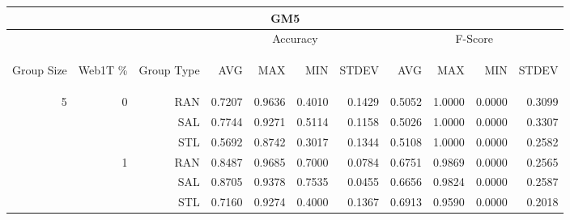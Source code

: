\begin{center}
\begin{table}[htbp]
\begin{tabular}{ | r | r | r | r | r | r | r | r | r | r | r |}
\hline
\multicolumn{11}{|c|}{GM5}\\
\hline
 & & & \multicolumn{4}{|c|}{Accuracy} & \multicolumn{4}{|c|}{F-Score}\\ \cline{4-11}
\begin{sideways}Group Size\end{sideways} & \begin{sideways}Web1T \%\end{sideways} & \begin{sideways}Group Type\end{sideways} & \begin{sideways}AVG\end{sideways} & \begin{sideways}MAX\end{sideways} & \begin{sideways}MIN\end{sideways} & \begin{sideways}STDEV\end{sideways} & \begin{sideways}AVG\end{sideways} & \begin{sideways}MAX\end{sideways} & \begin{sideways}MIN\end{sideways} & \begin{sideways}STDEV\end{sideways}\\
\hline
\multirow{18}{*}{5}
 & \multirow{3}{*}{0} & RAN & 0.7207 & 0.9636 & 0.4010 & 0.1429 & 0.5052 & 1.0000 & 0.0000 & 0.3099\\ \cline{3-11}
 &   & SAL & 0.7744 & 0.9271 & 0.5114 & 0.1158 & 0.5026 & 1.0000 & 0.0000 & 0.3307\\ \cline{3-11}
 &   & STL & 0.5692 & 0.8742 & 0.3017 & 0.1344 & 0.5108 & 1.0000 & 0.0000 & 0.2582\\ \cline{2-11}
 & \multirow{3}{*}{1} & RAN & 0.8487 & 0.9685 & 0.7000 & 0.0784 & 0.6751 & 0.9869 & 0.0000 & 0.2565\\ \cline{3-11}
 &   & SAL & 0.8705 & 0.9378 & 0.7535 & 0.0455 & 0.6656 & 0.9824 & 0.0000 & 0.2587\\ \cline{3-11}
 &   & STL & 0.7160 & 0.9274 & 0.4000 & 0.1367 & 0.6913 & 0.9590 & 0.0000 & 0.2018\\ \cline{2-11}

\end{tabular}
\end{table}
\end{center}
